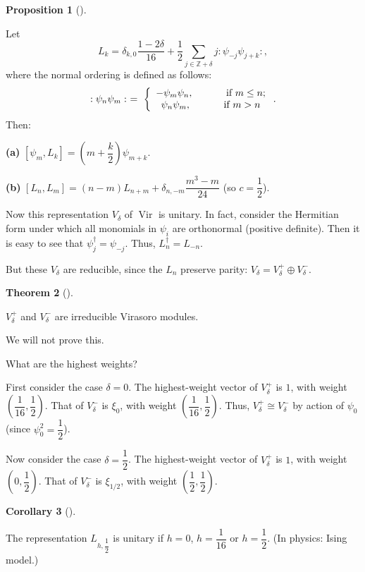 \documentclass
[numbers=enddot,12pt,final,onecolumn,german,notitlepage]{scrartcl}%
\theoremstyle{definition}
\newtheorem{theo}{Theorem}
\newenvironment{theorem}[1][]
{\begin{theo}[#1]\begin{leftbar}}
{\end{leftbar}\end{theo}}
\newtheorem{prop}[theo]{Proposition}
\newenvironment{proposition}[1][]
{\begin{prop}[#1]\begin{leftbar}}
{\end{leftbar}\end{prop}}
\newtheorem{coro}[theo]{Corollary}
\newenvironment{corollary}[1][]
{\begin{coro}[#1]\begin{leftbar}}
{\end{leftbar}\end{coro}}
\begin{document}
\begin{proposition}
Let%
\[
L_{k}=\delta_{k,0}\dfrac{1-2\delta}{16}+\dfrac{1}{2}\sum\limits_{j\in
\mathbb{Z}+\delta}j:\psi_{-j}\psi_{j+k}:,
\]
where the normal ordering is defined as follows:%
\[
:\psi_{n}\psi_{m}:\ =\ \left\{
\begin{array}
[c]{c}%
-\psi_{m}\psi_{n},\ \ \ \ \ \ \ \ \ \ \text{if }m\leq n;\\
\psi_{n}\psi_{m},\ \ \ \ \ \ \ \ \ \ \text{if }m>n
\end{array}
\right.  .
\]
Then:

\textbf{(a)} $\left[  \psi_{m},L_{k}\right]  =\left(  m+\dfrac{k}{2}\right)
\psi_{m+k}$.

\textbf{(b)} $\left[  L_{n},L_{m}\right]  =\left(  n-m\right)  L_{n+m}%
+\delta_{n,-m}\dfrac{m^{3}-m}{24}$ (so $c=\dfrac{1}{2}$).
\end{proposition}

Now this representation $V_{\delta}$ of $\operatorname*{Vir}$ is unitary. In
fact, consider the Hermitian form under which all monomials in $\psi_{i}$ are
orthonormal (positive definite). Then it is easy to see that $\psi_{j}^{\dag
}=\psi_{-j}$. Thus, $L_{n}^{\dag}=L_{-n}$.

But these $V_{\delta}$ are reducible, since the $L_{n}$ preserve parity:
$V_{\delta}=V_{\delta}^{+}\oplus V_{\delta}^{-}$.

\begin{theorem}
$V_{\delta}^{+}$ and $V_{\delta}^{-}$ are irreducible Virasoro modules.
\end{theorem}

We will not prove this.

What are the highest weights?

First consider the case $\delta=0$. The highest-weight vector of $V_{\delta
}^{+}$ is $1$, with weight $\left(  \dfrac{1}{16},\dfrac{1}{2}\right)  $. That
of $V_{\delta}^{-}$ is $\xi_{0}$, with weight $\left(  \dfrac{1}{16},\dfrac
{1}{2}\right)  $. Thus, $V_{\delta}^{+}\cong V_{\delta}^{-}$ by action of
$\psi_{0}$ (since $\psi_{0}^{2}=\dfrac{1}{2}$).

Now consider the case $\delta=\dfrac{1}{2}$. The highest-weight vector of
$V_{\delta}^{+}$ is $1$, with weight $\left(  0,\dfrac{1}{2}\right)  $. That
of $V_{\delta}^{-}$ is $\xi_{1/2}$, with weight $\left(  \dfrac{1}{2}%
,\dfrac{1}{2}\right)  $.

\begin{corollary}
The representation $L_{h,\dfrac{1}{2}}$ is unitary if $h=0$, $h=\dfrac{1}{16}$
or $h=\dfrac{1}{2}$. (In physics: Ising model.)
\end{corollary}
\end{document}
